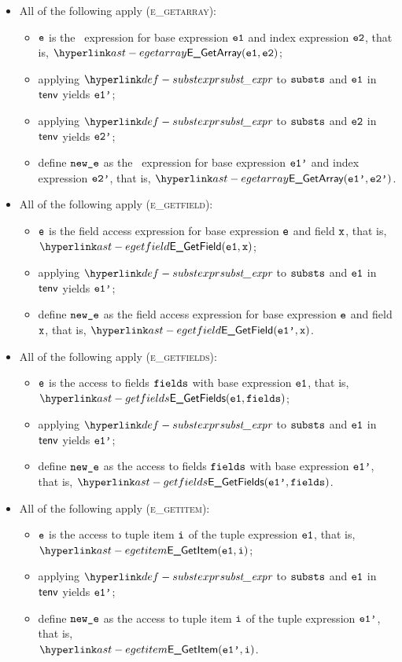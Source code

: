 \begin{itemize}
  \item All of the following apply (\textsc{e\_getarray}):
  \begin{itemize}
    \item $\texttt{e}$ is the \arrayaccess\ expression for base expression $\texttt{e1}$ and index expression $\texttt{e2}$,
          that is, $\EGetArray(\veone, \vetwo)$;
    \item applying $\substexpr$ to $\texttt{substs}$ and $\texttt{e1}$ in $\textsf{tenv}$ yields $\texttt{e1'}$;
    \item applying $\substexpr$ to $\texttt{substs}$ and $\texttt{e2}$ in $\textsf{tenv}$ yields $\texttt{e2'}$;
    \item define $\texttt{new\_e}$ as the \arrayaccess\ expression for base expression $\texttt{e1'}$ and index expression $\texttt{e2'}$,
    that is, $\EGetArray(\veonep, \vetwop)$.
  \end{itemize}

  \item All of the following apply (\textsc{e\_getfield}):
  \begin{itemize}
    \item $\texttt{e}$ is the field access expression for base expression $\texttt{e}$ and field $\texttt{x}$,
          that is, $\EGetField(\veone, \vx)$;
    \item applying $\substexpr$ to $\texttt{substs}$ and $\texttt{e1}$ in $\textsf{tenv}$ yields $\texttt{e1'}$;
    \item define $\texttt{new\_e}$ as the field access expression for base expression $\texttt{e}$ and field $\texttt{x}$,
          that is, $\EGetField(\veonep, \vx)$.
  \end{itemize}

  \item All of the following apply (\textsc{e\_getfields}):
  \begin{itemize}
    \item $\texttt{e}$ is the access to fields $\texttt{fields}$ with base expression $\texttt{e1}$, that is, \\
          $\EGetFields(\veone, \fields)$;
    \item applying $\substexpr$ to $\texttt{substs}$ and $\texttt{e1}$ in $\textsf{tenv}$ yields $\texttt{e1'}$;
    \item define $\texttt{new\_e}$ as the access to fields $\texttt{fields}$ with base expression $\texttt{e1'}$, that is, $\EGetFields(\veonep, \fields)$.
  \end{itemize}

  \item All of the following apply (\textsc{e\_getitem}):
  \begin{itemize}
    \item $\texttt{e}$ is the access to tuple item $\texttt{i}$ of the tuple expression $\texttt{e1}$, that is, \\
          $\EGetItem(\veone, \vi)$;
    \item applying $\substexpr$ to $\texttt{substs}$ and $\texttt{e1}$ in $\textsf{tenv}$ yields $\texttt{e1'}$;
    \item define $\texttt{new\_e}$ as the access to tuple item $\texttt{i}$ of the tuple expression $\texttt{e1'}$, that is, \\
          $\EGetItem(\veonep, \vi)$.
  \end{itemize}


\end{itemize}
